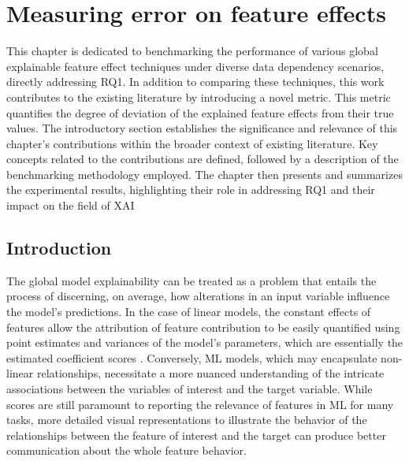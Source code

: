 \chapter{Measuring error on feature effects}
\label{chap:AssALE}

This chapter is dedicated to benchmarking the performance of various global explainable feature effect techniques under diverse data dependency scenarios, directly addressing RQ1. In addition to comparing these techniques, this work contributes to the existing literature by introducing a novel metric. This metric quantifies the degree of deviation of the explained feature effects from their true values. The introductory section establishes the significance and relevance of this chapter's contributions within the broader context of existing literature. Key concepts related to the contributions are defined, followed by a description of the benchmarking methodology employed. The chapter then presents and summarizes the experimental results, highlighting their role in addressing RQ1 and their impact on the field of \gls{XAI}

\begin{center}
\end{center}


\section{Introduction}

The global model explainability can be treated as a problem that entails the process of discerning, on average, how alterations in an input variable influence the model's predictions. In the case of linear models, the constant effects of features allow the attribution of feature contribution to be easily quantified using point estimates and variances of the model's parameters, which are essentially the estimated coefficient scores \cite{TrevorHastieRobertTibshirani2014AssessmentSelection}. Conversely, \gls{ML} models, which may encapsulate non-linear relationships, necessitate a more nuanced understanding of the intricate associations between the variables of interest and the target variable. While scores are still paramount to reporting the relevance of features in \gls{ML} for many tasks, more detailed visual representations to illustrate the behavior of the relationships between the feature of interest and the target can produce better communication about the whole feature behavior.

